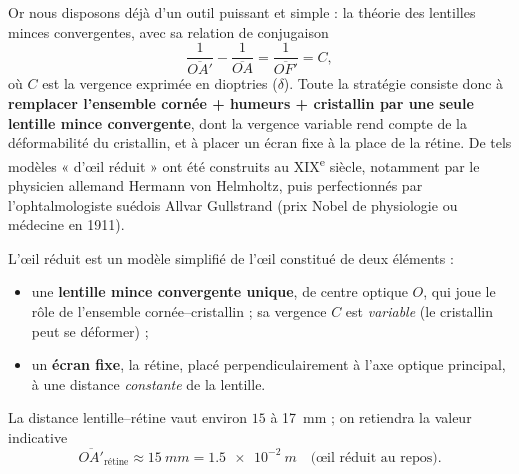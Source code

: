 \documentclass[11pt]{article}
\newcommand{\cle}[1]{{\popxbold\color{popdark}#1}}
\begin{document}
Or nous disposons déjà d'un outil puissant et simple : la théorie des \cle{lentilles minces convergentes}, avec sa relation de conjugaison
\[ \frac{1}{\overline{OA'}} - \frac{1}{\overline{OA}} = \frac{1}{\overline{OF'}} = C, \]
où $C$ est la vergence exprimée en dioptries ($\delta$). Toute la stratégie consiste donc à \textbf{remplacer l'ensemble cornée + humeurs + cristallin par une seule lentille mince convergente}, dont la vergence variable rend compte de la déformabilité du cristallin, et à placer un écran fixe à la place de la rétine. De tels modèles « d'œil réduit » ont été construits au XIX\textsuperscript{e} siècle, notamment par le physicien allemand Hermann von Helmholtz, puis perfectionnés par l'ophtalmologiste suédois Allvar Gullstrand (prix Nobel de physiologie ou médecine en 1911).

\begin{definition}
L'\cle{œil réduit} est un modèle simplifié de l'œil constitué de deux éléments :
\begin{itemize}
\item une \textbf{lentille mince convergente unique}, de centre optique $O$, qui joue le rôle de l'ensemble cornée--cristallin ; sa vergence $C$ est \emph{variable} (le cristallin peut se déformer) ;
\item un \textbf{écran fixe}, la rétine, placé perpendiculairement à l'axe optique principal, à une distance \emph{constante} de la lentille.
\end{itemize}
La distance lentille--rétine vaut environ $15$ à \SI{17}{mm} ; on retiendra la valeur indicative
\[ \overline{OA'}_{\text{rétine}} \approx \SI{15}{mm} = \SI{1,5e-2}{m} \quad \text{(œil réduit au repos)}. \]
\end{definition}
\end{document}
